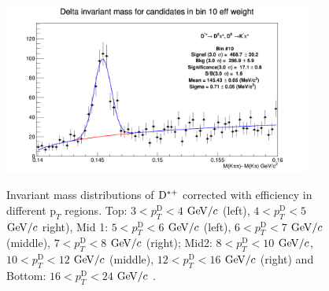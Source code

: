 \begin{figure}[!htp]
{\includegraphics[width=0.6\linewidth, height=5.6cm]{figures/Dstar_wEFF/InvMassDistributions_Dstar_Bins10to10.png}}

\caption{Invariant mass distributions of ${\rm D^{*+}}$ corrected with efficiency in different $\text{p}_T$ regions. Top: $3< p_{T}^{\text{D}}< 4$ $\mathrm{GeV}/c$ (left), $4< p_{T}^{\text{D}}< 5$ $\mathrm{GeV}/c$ right), Mid 1: $5< p_{T}^{\text{D}}< 6$ $\mathrm{GeV}/c$ (left), $6 < p_{T}^{\text{D}} < 7$ $\mathrm{GeV}/c$ (middle), $7< p_{T}^{\text{D}}< 8$ $\mathrm{GeV}/c$ (right); Mid2: $8< p_{T}^{\text{D}}< 10$ $\mathrm{GeV}/c$, $10< p_{T}^{\text{D}}< 12$ $\mathrm{GeV}/c$  (middle), $12 < p_{T}^{\text{D}}< 16$ $\mathrm{GeV}/c$  (right) and Bottom: $16<p_{T}^{\text{D}}< 24$ $\mathrm{GeV}/c$ .}
\label{fig:InvMassDs}
\end{figure}

